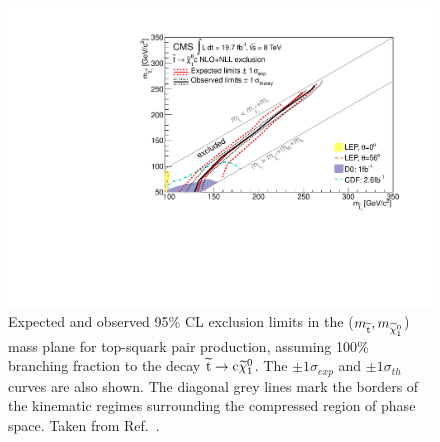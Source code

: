 \begin{figure}[!Hhtb]
  \begin{center}
  \includegraphics[scale=0.45]{Figures/sus13009/limits/limits_stopLSP.pdf}
  \caption{ Expected and observed 95\% \ac{CL} exclusion limits in the ($m_{\widetilde{{\rm t}}}, m_{\widetilde{\chi}^{0}_{1}}$) mass plane for top-squark pair production, assuming 100\% branching fraction to the decay $\widetilde{{\rm t}} \rightarrow {\rm c} \widetilde{\chi}^{0}_{1}$. The $\pm1\sigma_{exp}$ and $\pm1\sigma_{th}$ curves are also shown. The diagonal grey lines mark the borders of the kinematic regimes surrounding the compressed region of phase space. 
  Taken from Ref.~\cite{sus13009}.}
  \label{fig:stop_limits_2D}
  \end{center}
\end{figure}


